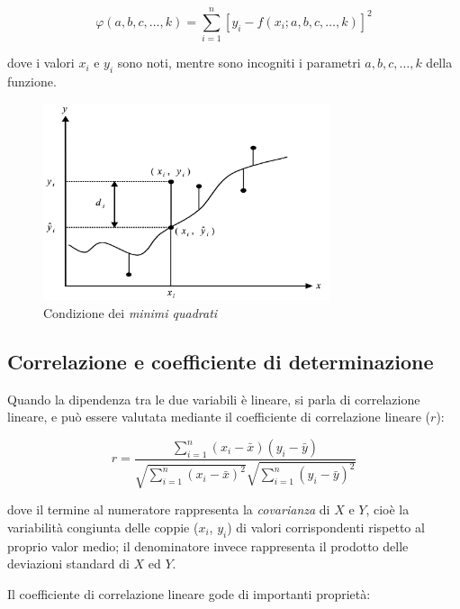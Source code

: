 $$\varphi(a, b, c, \ldots, k)=\sum_{i=1}^{n}\left[y_{i}-f\left(x_{i} ; a, b, c, \ldots, k\right)\right]^{2}$$\smallskip

dove i valori $x_i$ e $y_i$ sono noti, mentre sono incogniti i parametri $a , b , c , … , k$ della funzione. \cite{excel_per_statistica_belluco}

\begin{figure}[H]
\centering
\includegraphics[width=0.75\textwidth,height=\textheight,keepaspectratio]{img/minimi_quadrati.png}
\caption{Condizione dei \textit{minimi quadrati} \cite{excel_per_statistica_belluco}}
\label{fig:minimi_quadrati}
\end{figure}

\subsection{Correlazione e coefficiente di determinazione}\label{ssec:regressione-correlazione}

Quando la dipendenza tra le due variabili è lineare, si parla di correlazione lineare, e può essere valutata mediante il coefficiente di correlazione lineare ($r$):

$$r=\frac{\sum_{i=1}^{n}\left(x_{i}-\bar{x}\right)\left(y_{i}-\bar{y}\right)}{\sqrt{\sum_{i=1}^{n}\left(x_{i}-\bar{x}\right)^{2}} \sqrt{\sum_{i=1}^{n}\left(y_{i}-\bar{y}\right)^{2}}}$$\smallskip

dove il termine al numeratore rappresenta la \textit{covarianza} di $X$ e $Y$, cioè la variabilità congiunta delle coppie ($x_i$, $y_i$) di valori corrispondenti rispetto al proprio valor medio; il denominatore invece rappresenta il prodotto delle deviazioni standard di $X$ ed $Y$.

Il coefficiente di correlazione lineare gode di importanti proprietà:

